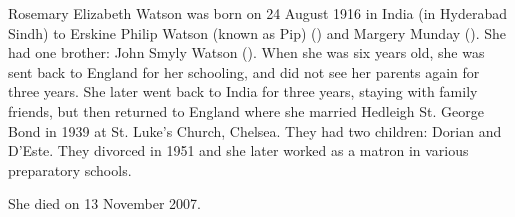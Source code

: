 
Rosemary Elizabeth Watson was born on 24 August 1916 in India (in Hyderabad Sindh) to Erskine Philip Watson (known as Pip) () and Margery Munday (). She had one brother:  John Smyly Watson (). When she was six years old, she was sent back to England for her schooling, and did not see her parents again for three years. She later went back to India for three years, staying with family friends, but then returned to England where she married Hedleigh St. George Bond in 1939 at St. Luke's Church, Chelsea. They had two children: Dorian and D'Este. They divorced in 1951 and she later worked as a matron in various preparatory schools.

She died on 13 November 2007.
